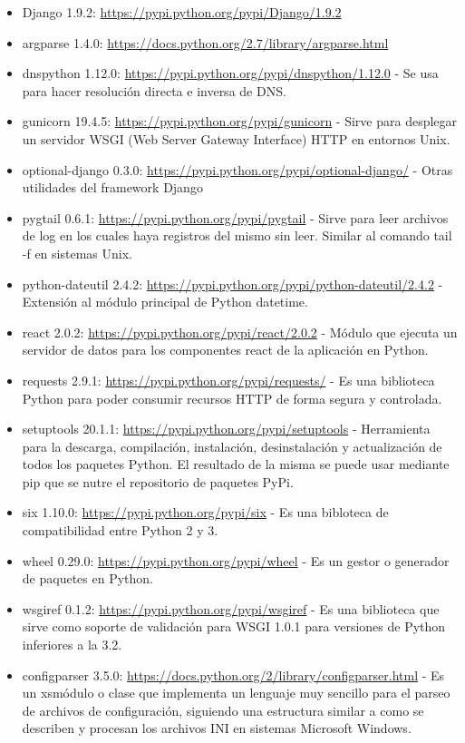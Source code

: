\begin{itemize}
  \item Django 1.9.2: \url{https://pypi.python.org/pypi/Django/1.9.2}
  \item argparse 1.4.0: \url{https://docs.python.org/2.7/library/argparse.html}
  \item dnspython 1.12.0: \url{https://pypi.python.org/pypi/dnspython/1.12.0} - Se usa para hacer resolución directa e inversa de DNS.
  \item gunicorn 19.4.5: \url{https://pypi.python.org/pypi/gunicorn} - Sirve para desplegar un servidor WSGI (Web Server Gateway Interface) HTTP en entornos Unix.
  \item optional-django 0.3.0: \url{https://pypi.python.org/pypi/optional-django/} - Otras utilidades del framework Django
  \item pygtail 0.6.1: \url{https://pypi.python.org/pypi/pygtail} - Sirve para leer archivos de log en los cuales haya registros del mismo sin leer. Similar al comando tail -f en sistemas Unix.
  \item python-dateutil 2.4.2: \url{https://pypi.python.org/pypi/python-dateutil/2.4.2} - Extensión al módulo principal de Python datetime.
  \item react 2.0.2: \url{https://pypi.python.org/pypi/react/2.0.2} - Módulo que ejecuta un servidor de datos para los componentes react de la aplicación en Python.
  \item requests 2.9.1: \url{https://pypi.python.org/pypi/requests/} - Es una biblioteca Python para poder consumir recursos HTTP de forma segura y controlada.
  \item setuptools 20.1.1: \url{https://pypi.python.org/pypi/setuptools} - Herramienta para la descarga, compilación, instalación, desinstalación y actualización de todos los paquetes Python. El resultado de la misma se puede usar mediante pip que se nutre el repositorio de paquetes PyPi.
  \item six 1.10.0: \url{https://pypi.python.org/pypi/six} - Es una bibloteca de compatibilidad entre Python 2 y 3.
  \item wheel 0.29.0: \url{https://pypi.python.org/pypi/wheel} - Es un gestor o generador de paquetes en Python.
  \item wsgiref 0.1.2: \url{https://pypi.python.org/pypi/wsgiref} - Es una biblioteca que sirve como soporte de validación para WSGI 1.0.1 para versiones de Python inferiores a la 3.2.
  \item configparser 3.5.0: \url{https://docs.python.org/2/library/configparser.html} - Es un xsmódulo o clase que implementa un lenguaje muy sencillo para el parseo de archivos de configuración, siguiendo una estructura similar a como se describen y procesan los archivos INI en sistemas Microsoft Windows.
\end{itemize}

